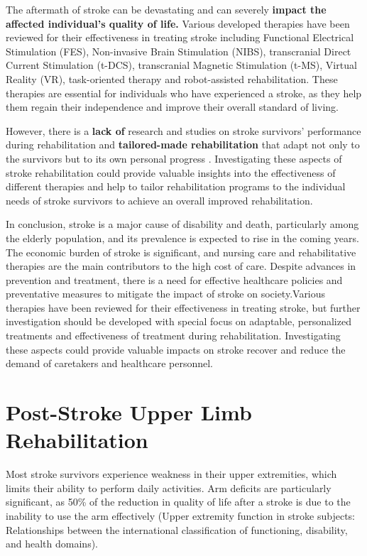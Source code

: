 The aftermath of stroke can be devastating and can severely \textbf{impact the affected individual's quality of life.} Various developed therapies have been reviewed for their effectiveness in treating stroke including Functional Electrical Stimulation (FES), Non-invasive Brain Stimulation (NIBS), transcranial Direct Current Stimulation (t-DCS), transcranial Magnetic Stimulation (t-MS), Virtual Reality (VR), task-oriented therapy and robot-assisted rehabilitation. These therapies are essential for individuals who have experienced a stroke, as they help them regain their independence and improve their overall standard of living.

However, there is a \textbf{lack of} research and studies on stroke survivors' performance during rehabilitation and \textbf{tailored-made rehabilitation} that adapt not only to the survivors but to its own personal progress \cite{Ismail2018}. Investigating these aspects of stroke rehabilitation could provide valuable insights into the effectiveness of different therapies and help to tailor rehabilitation programs to the individual needs of stroke survivors to achieve an overall improved rehabilitation.

In conclusion, stroke is a major cause of disability and death, particularly among the elderly population, and its prevalence is expected to rise in the coming years. The economic burden of stroke is significant, and nursing care and rehabilitative therapies are the main contributors to the high cost of care. Despite advances in prevention and treatment, there is a need for effective healthcare policies and preventative measures to mitigate the impact of stroke on society.Various therapies have been reviewed for their effectiveness in treating stroke, but further investigation should be developed with special focus on adaptable, personalized treatments and effectiveness of treatment during rehabilitation. Investigating these aspects could provide valuable impacts on stroke recover and reduce the demand of caretakers and healthcare personnel. 

\section{Post-Stroke Upper Limb Rehabilitation}

Most stroke survivors experience weakness in their upper extremities, which limits their ability to perform daily activities. Arm deficits are particularly significant, as 50\% of the reduction in quality of life after a stroke is due to the inability to use the arm effectively (Upper extremity function in stroke subjects: Relationships between the international classification of functioning, disability, and health domains). 


